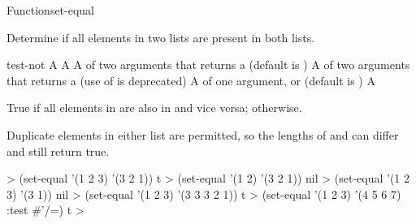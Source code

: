 \documentclass[10pt,twoside,english,pdftex]{article}
\begin{document}
\begin{functiondoc}{Function}{set-equal}{
     
    \returns{} }

\fnsyntax

\fnpurpose Determine if all elements in two lists are present in both lists.

\fnpackage {}

\fnmodule {}

\fnargs
\begin{args}{test-not}
\arg[list-1] A 
\arg[list-2] A 
\arg[test] A  of two arguments that returns a
 (default is ) 
 A  of two arguments that returns a
 (use of  is deprecated)
\arg[key] A  of one argument, or \nil{} (default is \nil)
\arg[boolean] A 
\end{args}

\fnreturns True if all elements in  are also in
 and vice versa; \nil{} otherwise.

\fndescription Duplicate elements in either list are permitted, so the lengths
of  and  can differ and still return
true.

\fnexamples
%
\W\supp
\begin{example}
  > (set-equal '(1 2 3) '(3 2 1))
  t
  > (set-equal '(1 2) '(3 2 1))
  nil\goodpagebreak
  > (set-equal '(1 2 3) '(3 1))
  nil
  > (set-equal '(1 2 3) '(3 3 3 2 1))
  t
  > (set-equal '(1 2 3) '(4 5 6 7) :test #'/=)
  t
  >
\end{example}

\end{functiondoc}

\end{document}
